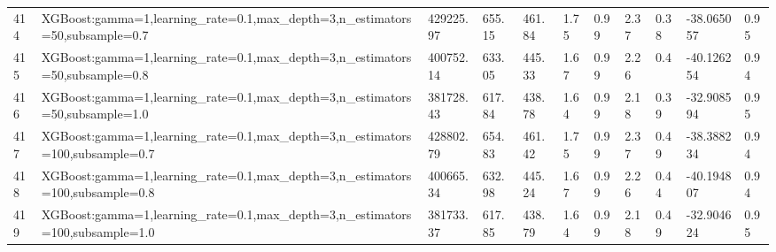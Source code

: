 \begin{longtable}{C{0.8cm} L{2cm} C{1.15cm} C{1.15cm} C{1.15cm} C{1.15cm} C{0.85cm} C{1.25cm} C{1.2cm} C{1.5cm} C{1.0cm}}
414 & XGBoost:\newline gamma=1,\newline learning\_rate=0.1,\newline max\_depth=3,\newline n\_estimators=50,\newline subsample=0.7 & 429225.97 & 655.15 & 461.84 & 1.75 & 0.99 & 2.37 & 0.38 & -38.065057 & 0.95 \\
415 & XGBoost:\newline gamma=1,\newline learning\_rate=0.1,\newline max\_depth=3,\newline n\_estimators=50,\newline subsample=0.8 & 400752.14 & 633.05 & 445.33 & 1.67 & 0.99 & 2.26 & 0.4 & -40.126254 & 0.94 \\
416 & XGBoost:\newline gamma=1,\newline learning\_rate=0.1,\newline max\_depth=3,\newline n\_estimators=50,\newline subsample=1.0 & 381728.43 & 617.84 & 438.78 & 1.64 & 0.99 & 2.18 & 0.39 & -32.908594 & 0.95 \\
417 & XGBoost:\newline gamma=1,\newline learning\_rate=0.1,\newline max\_depth=3,\newline n\_estimators=100,\newline subsample=0.7 & 428802.79 & 654.83 & 461.42 & 1.75 & 0.99 & 2.37 & 0.49 & -38.388234 & 0.94 \\
418 & XGBoost:\newline gamma=1,\newline learning\_rate=0.1,\newline max\_depth=3,\newline n\_estimators=100,\newline subsample=0.8 & 400665.34 & 632.98 & 445.24 & 1.67 & 0.99 & 2.26 & 0.44 & -40.194807 & 0.94 \\
419 & XGBoost:\newline gamma=1,\newline learning\_rate=0.1,\newline max\_depth=3,\newline n\_estimators=100,\newline subsample=1.0 & 381733.37 & 617.85 & 438.79 & 1.64 & 0.99 & 2.18 & 0.49 & -32.904624 & 0.95 \\

\end{longtable}
